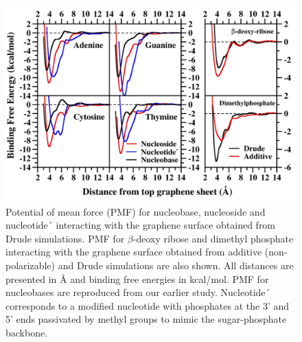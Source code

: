 \begin{figure}
    \centering
    \includegraphics[width=\textwidth]{Chapter4/Figures/Figure11.png}
    \caption[Potential of mean force (PMF) for nucleobase, nucleoside, nucleotide´, $\beta$-deoxy ribose and dimethyl phosphate interacting with the graphene surface obtained from Drude simulations.]{Potential of mean force (PMF) for nucleobase, nucleoside and nucleotide´ interacting with the graphene surface obtained from Drude simulations. PMF for $\beta$-deoxy ribose and dimethyl phosphate interacting with the graphene surface obtained from additive (non-polarizable) and Drude simulations are also shown. All distances are presented in Å and binding free energies in kcal/mol. PMF for nucleobases are reproduced from our earlier study.\supercite{h_polarization_2021} Nucleotide´ corresponds to a modified nucleotide with phosphates at the 3’ and 5’ ends passivated by methyl groups to mimic the sugar-phosphate backbone.}
\end{figure}
